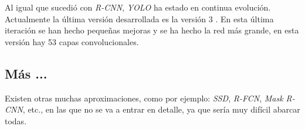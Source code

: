 Al igual que sucedió con \textit{R-CNN}, \textit{YOLO} ha estado en continua evolución. Actualmente la última versión desarrollada es la versión 3 \cite{s2_stateofart_yolov3}. En esta última iteración se han hecho pequeñas mejoras y se ha hecho la red más grande, en esta versión hay 53 capas convolucionales.

\subsection*{Más ...}

Existen otras muchas aproximaciones, como por ejemplo: \textit{SSD}, \textit{R-FCN}, \textit{Mask R-CNN}, etc., en las que no se va a entrar en detalle, ya que sería muy difícil abarcar todas.